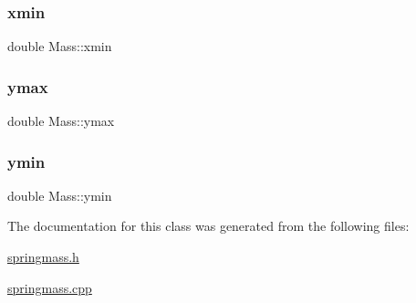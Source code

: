 \mbox{\label{classMass_ad8c92b972c0c32e382bdd180cef9fa37}} 
\subsubsection{\texorpdfstring{xmin}{xmin}}
{\footnotesize\ttfamily double Mass\+::xmin\hspace{0.3cm}{\ttfamily [protected]}}

\mbox{\label{classMass_a2d5d2f1659dfc4b43096e6f5140114cc}} 
\subsubsection{\texorpdfstring{ymax}{ymax}}
{\footnotesize\ttfamily double Mass\+::ymax\hspace{0.3cm}{\ttfamily [protected]}}

\mbox{\label{classMass_a994eea18acef1ab497634ae6c45e627a}} 
\subsubsection{\texorpdfstring{ymin}{ymin}}
{\footnotesize\ttfamily double Mass\+::ymin\hspace{0.3cm}{\ttfamily [protected]}}



The documentation for this class was generated from the following files\+:\begin{DoxyCompactItemize}
\item 
\hyperlink{springmass_8h}{springmass.\+h}\item 
\hyperlink{springmass_8cpp}{springmass.\+cpp}\end{DoxyCompactItemize}
